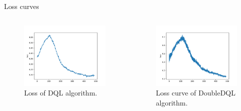 \documentclass{beamer}
\begin{document}
\begin{frame}{Loss curves} 
		\begin{columns}[c] %
		
		\begin{figure}
	\includegraphics[width=\textwidth]{loss_per_epoch_gdim-16_gamma-0.85_nepisodes-500_explorationstop-0.25_b-32_dql-False}
\caption{Loss of DQL algorithm.}
\label{fig:dqlloss}
		\end{figure}
		
		\begin{figure}
	\includegraphics[width=\textwidth]{loss_per_epoch_gdim-16_gamma-0.85_nepisodes-500_explorationstop-0.25_b-32_dql-True}
\caption{Loss curve of DoubleDQL algorithm.}
\label{fig:doubledqlloss}
		\end{figure}	
		
	\end{columns}
\end{frame}
\end{document}

